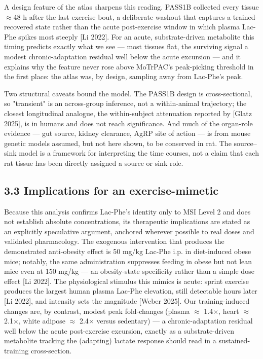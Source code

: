 \documentclass[11pt]{article}
\begin{document}
A design feature of the atlas sharpens this reading. PASS1B collected every tissue
$\approx$48 h after the last exercise bout, a deliberate washout that captures a
trained-recovered state rather than the acute post-exercise window in which plasma Lac-Phe
spikes most steeply [Li 2022]. For an acute, substrate-driven metabolite this timing predicts
exactly what we see --- most tissues flat, the surviving signal a modest chronic-adaptation
residual well below the acute excursion --- and it explains why the feature never rose above
MoTrPAC's peak-picking threshold in the first place: the atlas was, by design, sampling away
from Lac-Phe's peak.

Two structural caveats bound the model. The PASS1B design is cross-sectional, so "transient"
is an across-group inference, not a within-animal trajectory; the closest longitudinal
analogue, the within-subject attenuation reported by [Glatz 2025], is in humans and does not
reach significance. And much of the organ-role evidence --- gut source, kidney clearance, AgRP
site of action --- is from mouse genetic models assumed, but not here shown, to be conserved in
rat. The source--sink model is a framework for interpreting the time courses, not a claim
that each rat tissue has been directly assigned a source or sink role.

\subsection*{3.3 Implications for an exercise-mimetic}

Because this analysis confirms Lac-Phe's identity only to MSI Level 2 and does not establish
absolute concentrations, its therapeutic implications are stated as an explicitly speculative
argument, anchored wherever possible to real doses and validated pharmacology. The exogenous
intervention that produces the demonstrated anti-obesity effect is 50 mg/kg Lac-Phe i.p. in
diet-induced obese mice; notably, the same administration suppresses feeding in obese but not
lean mice even at 150 mg/kg --- an obesity-state specificity rather than a simple dose effect
[Li 2022]. The physiological stimulus this mimics is acute: sprint exercise produces the
largest human plasma Lac-Phe elevation, still detectable hours later [Li 2022], and intensity
sets the magnitude [Weber 2025]. Our training-induced changes are, by contrast, modest peak
fold-changes (plasma $\approx$ 1.4$\times$, heart $\approx$ 2.1$\times$, white adipose $\approx$ 2.4$\times$ versus sedentary) --- a
chronic-adaptation residual well below the acute post-exercise excursion, exactly as a
substrate-driven metabolite tracking the (adapting) lactate response should read in a
sustained-training cross-section.
\end{document}
